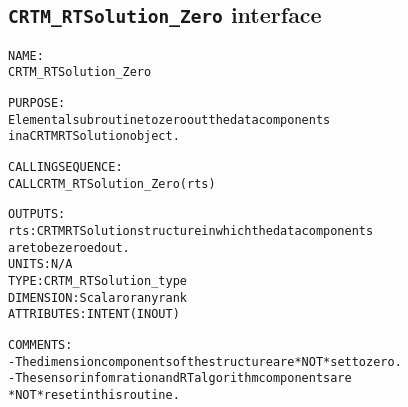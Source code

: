 \subsection{\texttt{CRTM\_RTSolution\_Zero} interface}
  \label{sec:CRTM_RTSolution_Zero_interface}
  \begin{alltt}
 
  NAME:
        CRTM_RTSolution_Zero
 
  PURPOSE:
        Elemental subroutine to zero out the data components
        in a CRTM RTSolution object.
 
  CALLING SEQUENCE:
        CALL CRTM_RTSolution_Zero( rts )
 
  OUTPUTS:
        rts:          CRTM RTSolution structure in which the data components
                      are to be zeroed out.
                      UNITS:      N/A
                      TYPE:       CRTM_RTSolution_type
                      DIMENSION:  Scalar or any rank
                      ATTRIBUTES: INTENT(IN OUT)
 
  COMMENTS:
        - The dimension components of the structure are *NOT* set to zero.
        - The sensor infomration and RT algorithm components are
          *NOT* reset in this routine.
 
  \end{alltt}
